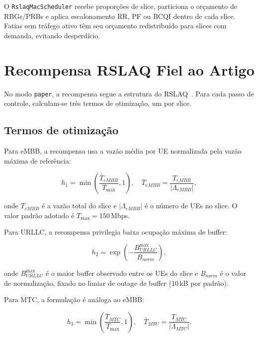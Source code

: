 \documentclass[10pt,a4paper]{IEEEtran}
\begin{document}
O \texttt{RslaqMacScheduler} recebe propor\c{c}\~{o}es de slice,
particiona o or\c{c}amento de RBGs/PRBs e aplica
escalonamento RR, PF ou BCQI dentro de cada slice. Fatias sem
tr\'{a}fego ativo t\^{e}m seu or\c{c}amento redistribu\'{i}do
para slices com demanda, evitando desperd\'{i}cio.

\section{Recompensa RSLAQ Fiel ao Artigo}
\label{sec:reward_paper}

No modo \texttt{paper}, a recompensa segue a estrutura do
RSLAQ~\cite{yungaicela2026rslaq}. Para cada passo de controle,
calculam-se tr\^{e}s termos de otimiza\c{c}\~{a}o, um por slice.

\subsection{Termos de otimiza\c{c}\~{a}o}

Para eMBB, a recompensa usa a vaz\~{a}o m\'{e}dia por UE
normalizada pela vaz\~{a}o m\'{a}xima de refer\^{e}ncia:

\begin{equation}
h_1 = \min\!\left(\frac{\bar{T}_{\textit{eMBB}}}{T_{\max}}, 1\right),\quad
\bar{T}_{\textit{eMBB}}=\frac{T_{\textit{eMBB}}}{|\Lambda_{\textit{eMBB}}|},
\label{eq:h1}
\end{equation}

onde $T_{\textit{eMBB}}$ \'{e} a vaz\~{a}o total do slice e
$|\Lambda_{\textit{eMBB}}|$ \'{e} o n\'{u}mero de UEs no slice.
O valor padr\~{a}o adotado \'{e} $T_{\max}=150$\,Mbps.

Para URLLC, a recompensa privilegia baixa ocupa\c{c}\~{a}o
m\'{a}xima de buffer:

\begin{equation}
h_2 = \exp\!\left(-\frac{B^{\max}_{\textit{URLLC}}}{B_{\textit{norm}}}\right),
\label{eq:h2}
\end{equation}

onde $B^{\max}_{\textit{URLLC}}$ \'{e} o maior buffer observado
entre os UEs do slice e $B_{\textit{norm}}$ \'{e} o valor de
normaliza\c{c}\~{a}o, fixado no limiar de outage de buffer
(10\,kB por padr\~{a}o).

Para MTC, a formula\c{c}\~{a}o \'{e} an\'{a}loga ao eMBB:

\begin{equation}
h_3 = \min\!\left(\frac{\bar{T}_{\textit{MTC}}}{T_{\max}}, 1\right),\quad
\bar{T}_{\textit{MTC}}=\frac{T_{\textit{MTC}}}{|\Lambda_{\textit{MTC}}|}.
\label{eq:h3}
\end{equation}
\end{document}
